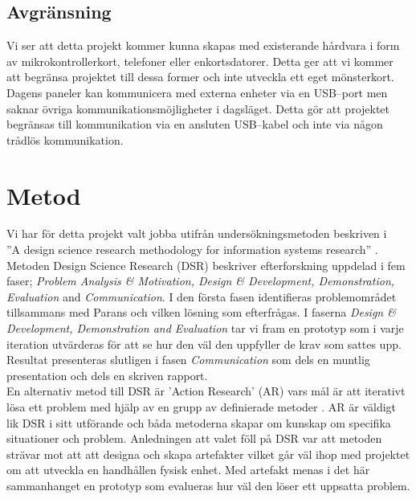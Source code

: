 \documentclass{article}
\begin{document}

        \subsection{Avgränsning} %
        \label{sub:avgransning}
            Vi ser att detta projekt kommer kunna skapas med existerande hårdvara i form av mikrokontrollerkort, telefoner eller enkortsdatorer. Detta ger att vi kommer att begränsa projektet till dessa former och inte utveckla ett eget mönsterkort.\\

            \noindent Dagens paneler kan kommunicera med externa enheter via en USB--port men saknar övriga kommunikationsmöjligheter i dagsläget. Detta gör att projektet begränsas till kommunikation via en ansluten USB--kabel och inte via någon trådlös kommunikation.

    \section{Metod} %
    \label{sec:metod}

        Vi har för detta projekt valt jobba utifrån undersökningsmetoden beskriven i \\
        ''A design science research methodology for information systems research'' \cite{method}. \\

        \noindent Metoden Design Science Research (DSR) beskriver efterforskning uppdelad i fem faser;
        \textit{Problem Analysis \& Motivation, Design \& Development, Demonstration, Evaluation} and \textit{Communication}. 
        I den första fasen identifieras problemområdet tillsammans med Parans och vilken lösning som efterfrågas. I faserna \textit{Design \& Development, Demonstration and Evaluation} tar vi fram en prototyp som i varje iteration utvärderas för att se hur den väl den uppfyller de krav som sattes upp.
        Resultat presenteras slutligen i fasen \textit{Communication} som dels en muntlig presentation och dels en skriven rapport. \\

        \noindent En alternativ metod till DSR är 'Action Research' (AR) vars mål är att iterativt lösa ett problem med hjälp av en grupp av definierade metoder \cite{actionresearch}. AR är väldigt lik DSR i sitt utförande \cite{designscience} och båda metoderna skapar om kunskap om specifika situationer och problem. Anledningen att valet föll på DSR var att metoden strävar mot att att designa och skapa artefakter vilket går väl ihop med projektet om att utveckla en handhållen fysisk enhet. 
        Med artefakt menas i det här sammanhanget en prototyp som evalueras hur väl den löser ett uppsatta problem. 
\end{document}
